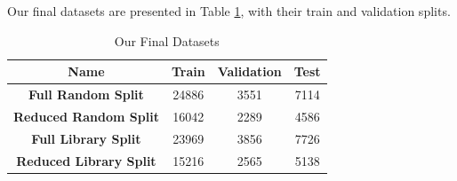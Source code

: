 Our final datasets are presented in Table \ref{tab:final_datasets}, with their train and validation splits.



\begin{table}[tb]
    \centering

    \begin{tabular}{c c c c}
    \hline
    Name       & Train & Validation & Test \\
    \hline
    \hline
    \textbf{Full Random Split}         & 24886 & 3551 & 7114 \\
    \textbf{Reduced Random Split}      & 16042 & 2289 & 4586\\
    \hline
    \hline
    \textbf{Full Library Split}         & 23969 & 3856 &7726 \\
    \textbf{Reduced Library Split}      & 15216 & 2565 & 5138 \\
    \hline
    \hline
    \end{tabular}
    \caption{Our Final Datasets}
    \label{tab:final_datasets}
\end{table}
